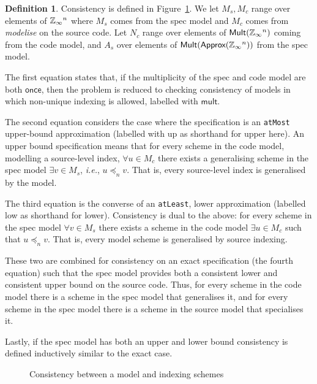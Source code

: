 \documentclass[9pt,preprint]{sigplanconf}
\newcounter{block}
\theoremstyle{definition}
\newtheorem{definition}[block]{Definition}
\newcommand{\ie}{\emph{i.e.}}
\newcommand{\term}[1]{\texttt{#1}}
\begin{document}
\begin{definition}
Consistency is defined in Figure~\ref{fig:consistency}. We let
$M_s, M_c$ range over elements of $\mathbb{Z}_\infty{}^n$ where $M_s$ comes
from the spec model and $M_c$ comes from \textit{modelise} on the
source code. Let $N_c$ range over elements of
$\textsf{Mult}(\mathbb{Z}_\infty{}^n)$ coming from the code model, and $A_s$
over elements of $\textsf{Mult}(\textsf{Approx}(\mathbb{Z}_\infty{}^n))$ from the spec model.

The first equation states that, if the multiplicity of the spec and code
model are both $\mathsf{once}$, then the problem is reduced to checking consistency of
models in which non-unique indexing is allowed, labelled with
$\mathsf{mult}$. 

The second equation considers the case where the specification is
an \term{atMost} upper-bound approximation (labelled with \textsf{up}
as shorthand for \textsf{upper} here). 
An upper bound specification means that for every scheme in the code
model, modelling a source-level index, $\forall u \in M_c$ there exists
a generalising scheme in the spec model $\exists v \in M_s$, \ie{}, $u
\preceq_n v$. That is, every source-level index is generalised by the model.

The third equation is the converse of an \term{atLeast},
lower approximation (labelled \textsf{low} as shorthand for
\textsf{lower}). Consistency is dual to the above: 
for every scheme in the spec model $\forall v \in M_s$ there
exists a scheme in the code model $\exists u \in M_c$ such that $u
\preceq_n v$. That is, every model scheme is generalised by source indexing.

These two are combined for consistency on an \textsf{exact}
specification (the fourth equation) such that the spec model
provides both a consistent lower and consistent upper bound on
the source code. Thus, for every scheme in the code model there
is a scheme in the spec model that generalises it, and for every
scheme in the spec model there is a scheme in the source model that
specialises it.  

Lastly, if the spec model has both an upper and lower bound
consistency is defined inductively similar to the \textsf{exact} case.
\end{definition}

\begin{figure}
\vspace{-0.4em}

\caption{Consistency between a model and indexing schemes}
\label{fig:consistency}
\vspace{-0.9em}
\end{figure}
\end{document}
